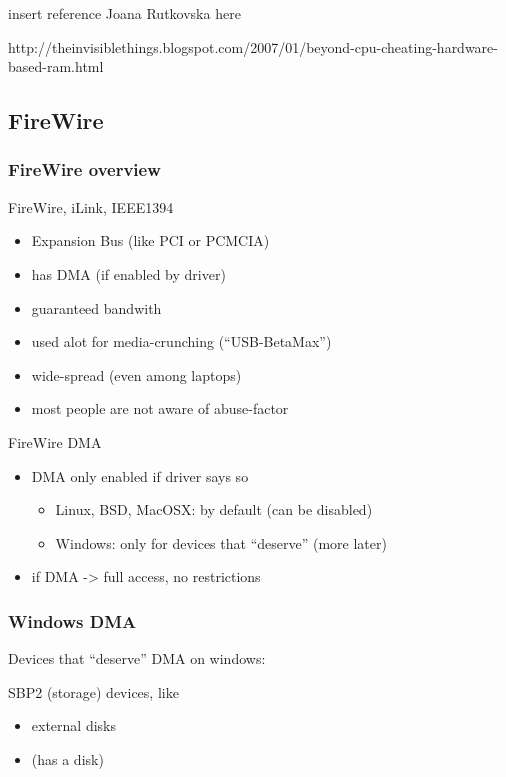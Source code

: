 \documentclass{beamer}
\newenvironment{itemizeframe}[1]
  {\begin{frame}{#1}\startitemizeframe}
  {\stopitemizeframe\end{frame}}
\newcommand\startitemizeframe{\begin{itemize}}
\newcommand\stopitemizeframe{\end{itemize}}
\begin{document}
		\begin{frame}
			\alert{insert reference Joana Rutkovska here}

			http://theinvisiblethings.blogspot.com/2007/01/beyond-cpu-cheating-hardware-based-ram.html
		\end{frame}

	\subsection{FireWire}

		\begin{frame} \frametitle{FireWire overview}
			 FireWire, iLink, IEEE1394
			\begin{itemize}
				\item Expansion Bus (like PCI or PCMCIA)
				\item has DMA (if enabled by driver)
				\item guaranteed bandwith
				\item used alot for media-crunching ("`USB-BetaMax"')
				\item wide-spread (even among laptops)
				\item most people are not aware of abuse-factor
			\end{itemize}
		\end{frame}

		\begin{itemizeframe}{FireWire DMA}
			\item DMA only enabled if driver says so
			\begin{itemize}
				\item Linux, BSD, MacOSX: by default (can be disabled)
				\item Windows: only for devices that "`deserve"' (more later)
			\end{itemize}
			\item if DMA -> full access, no restrictions
		\end{itemizeframe}

		\begin{frame} \frametitle{Windows DMA}
			Devices that "`deserve"' DMA on windows:

			SBP2 (storage) devices, like
			\begin{itemize}
				\item external disks
				\item {} (has a disk)
			\end{itemize}

		\end{frame}
		
\end{document}
